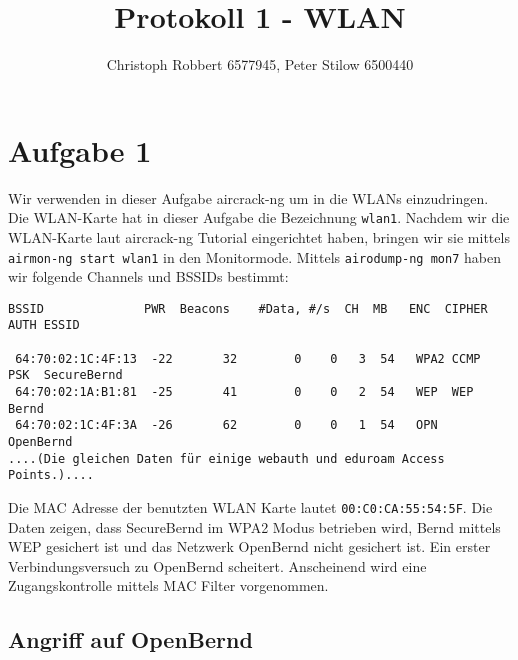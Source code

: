 \documentclass[10pt,a4paper]{article}
\author{Christoph Robbert 6577945, Peter Stilow 6500440}
\title{Protokoll 1 - WLAN}
\begin{document}
\maketitle
 
\section{Aufgabe 1}

Wir verwenden in dieser Aufgabe aircrack-ng um in die WLANs einzudringen. Die WLAN-Karte hat in dieser Aufgabe die Bezeichnung \texttt{wlan1}.
Nachdem wir die WLAN-Karte laut aircrack-ng Tutorial eingerichtet haben, bringen wir sie mittels
\texttt{airmon-ng start wlan1} in den Monitormode. Mittels \texttt{airodump-ng mon7} haben wir folgende Channels und BSSIDs bestimmt:
\begin{verbatim}
BSSID              PWR  Beacons    #Data, #/s  CH  MB   ENC  CIPHER AUTH ESSID                                                                                                 
                                                                                                                                                                                
 64:70:02:1C:4F:13  -22       32        0    0   3  54   WPA2 CCMP   PSK  SecureBernd                                                                                           
 64:70:02:1A:B1:81  -25       41        0    0   2  54   WEP  WEP         Bernd                                                                                                 
 64:70:02:1C:4F:3A  -26       62        0    0   1  54   OPN              OpenBernd                                                                                             
....(Die gleichen Daten für einige webauth und eduroam Access Points.)....
\end{verbatim}
Die MAC Adresse der benutzten WLAN Karte lautet \texttt{00:C0:CA:55:54:5F}.
Die Daten zeigen, dass SecureBernd im WPA2 Modus betrieben wird, Bernd mittels WEP gesichert ist und das Netzwerk OpenBernd nicht gesichert ist. Ein erster Verbindungsversuch zu OpenBernd scheitert. Anscheinend wird eine Zugangskontrolle mittels MAC Filter vorgenommen.

\subsection{Angriff auf OpenBernd}
\end{document}
